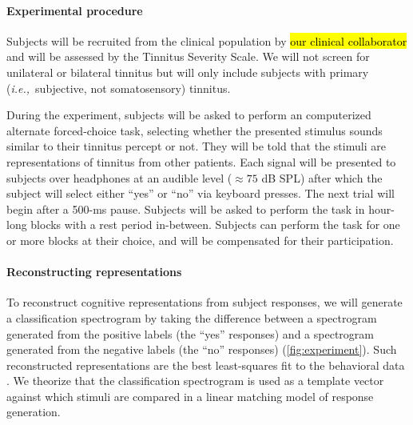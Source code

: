 \documentclass[11pt, notitlepage]{article} %
\def\ie{{\emph{i.e.,}}~}
\begin{document}
\paragraph{Experimental procedure}

Subjects will be recruited from the clinical population by \hl{our clinical collaborator}
and will be assessed by the Tinnitus Severity Scale.
We will not screen for unilateral or bilateral tinnitus but will only include subjects
with primary (\ie subjective, not somatosensory) tinnitus.

During the experiment, subjects will be asked to perform an computerized alternate forced-choice task,
selecting whether the presented stimulus sounds similar to their tinnitus percept or not.
They will be told that the stimuli are representations of tinnitus from other patients.
Each signal will be presented to subjects over headphones
at an audible level ($\approx 75$ dB SPL) after which
the subject will select either ``yes'' or ``no'' via keyboard presses.
The next trial will begin after a 500-ms pause.
Subjects will be asked to perform the task in hour-long blocks with a rest period in-between.
Subjects can perform the task for one or more blocks at their choice,
and will be compensated for their participation.

\paragraph{Reconstructing representations}

To reconstruct cognitive representations from subject responses,
we will generate a classification spectrogram by taking the difference
between a spectrogram generated from the positive labels (the ``yes'' responses)
and a spectrogram generated from the negative labels (the ``no'' responses)
(\autoref{fig:experiment}).
Such reconstructed representations are the best least-squares fit to the behavioral data
\cite{gosselinSuperstitiousPerceptionsReveal2003}.
We theorize that the classification spectrogram is used as a template vector
against which stimuli are compared in a linear matching model of response generation.
\end{document}
